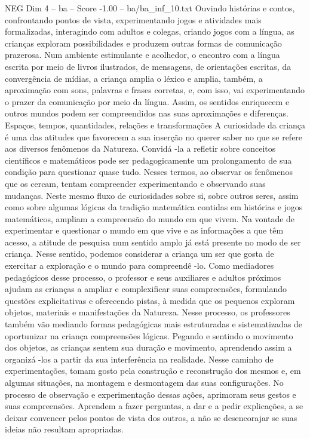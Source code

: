 \begin{textsample}{NEG Dim 4 – ba – Score -1.00 – ba/ba\_inf\_10.txt}
Ouvindo histórias e contos, confrontando pontos de vista, experimentando jogos e atividades mais formalizadas, interagindo com adultos e colegas, criando jogos com a língua, as crianças exploram possibilidades e produzem outras formas de comunicação prazerosa.
Num ambiente estimulante e acolhedor, o encontro com a língua escrita por meio de livros ilustrados, de mensagens, de orientações escritas, da convergência de mídias, a criança amplia o léxico e amplia, também, a aproximação com sons, palavras e frases corretas, e, com isso, vai experimentando o prazer da comunicação por meio da língua.
Assim, os sentidos enriquecem e outros mundos podem ser compreendidos nas suas aproximações e diferenças.
Espaços, tempos, quantidades, relações e transformações A curiosidade da criança é uma das atitudes que favorecem a sua inserção no querer saber no que se refere aos diversos fenômenos da Natureza.
Convidá -la a refletir sobre conceitos científicos e matemáticos pode ser pedagogicamente um prolongamento de sua condição para questionar quase tudo.
Nesses termos, ao observar os fenômenos que os cercam, tentam compreender experimentando e observando suas mudanças.
Neste mesmo fluxo de curiosidades sobre si, sobre outros seres, assim como sobre algumas lógicas da tradição matemática contidas em histórias e jogos matemáticos, ampliam a compreensão do mundo em que vivem.
Na vontade de experimentar e questionar o mundo em que vive e as informações a que têm acesso, a atitude de pesquisa num sentido amplo já está presente no modo de ser criança.
Nesse sentido, podemos considerar a criança um ser que gosta de exercitar a exploração e o mundo para compreendê -lo.
Como mediadores pedagógicos desse processo, o professor e seus auxiliares e adultos próximos ajudam as crianças a ampliar e complexificar suas compreensões, formulando questões explicitativas e oferecendo pistas, à medida que os pequenos exploram objetos, materiais e manifestações da Natureza.
Nesse processo, os professores também vão mediando formas pedagógicas mais estruturadas e sistematizadas de oportunizar na criança compreensões lógicas.
Pegando e sentindo o movimento dos objetos, as crianças sentem sua duração e movimento, aprendendo assim a organizá -los a partir da sua interferência na realidade.
Nesse caminho de experimentações, tomam gosto pela construção e reconstrução dos mesmos e, em algumas situações, na montagem e desmontagem das suas configurações.
No processo de observação e experimentação dessas ações, aprimoram seus gestos e suas compreensões.
Aprendem a fazer perguntas, a dar e a pedir explicações, a se deixar convencer pelos pontos de vista dos outros, a não se desencorajar se suas ideias não resultam apropriadas.

\end{textsample}
